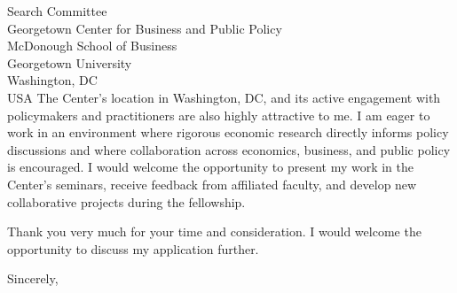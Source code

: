 \documentclass[11pt,letterpaper]{letter}
\begin{document}
\begin{letter}{Search Committee \\
Georgetown Center for Business and Public Policy \\
McDonough School of Business \\
Georgetown University \\
Washington, DC \\ USA}
The Center’s location in Washington, DC, and its active engagement with policymakers and practitioners are also highly attractive to me. I am eager to work in an environment where rigorous economic research directly informs policy discussions and where collaboration across economics, business, and public policy is encouraged. I would welcome the opportunity to present my work in the Center’s seminars, receive feedback from affiliated faculty, and develop new collaborative projects during the fellowship.

Thank you very much for your time and consideration. I would welcome the opportunity to discuss my application further.

\closing{Sincerely,}

\end{letter}
\end{document}
